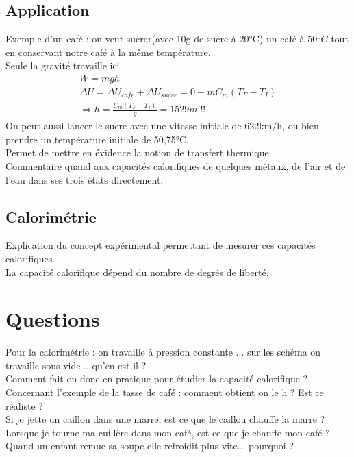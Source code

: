 \documentclass[12pt,prb,aps,epsf]{report}
\begin{document}
\subsection{Application}
Exemple d'un café : on veut sucrer(avec 10g de sucre à 20°C) un café à $50°C$ tout en conservant notre café à la même température.\\
Seule la gravité travaille ici
\begin{eqnarray}
W = mgh\\
\Delta U = \Delta U_{cafe} + \Delta U_{sucre} = 0 + mC_m(T_F-T_I)\\
\Rightarrow h= \frac{C_m(T_F-T_I)}{g} = 1529m!!!
\end{eqnarray}
On peut aussi lancer le sucre avec une vitesse initiale de 622km/h, ou bien prendre un température initiale de 50,75°C.\\
Permet de mettre en évidence la notion de transfert thermique.\\
Commentaire quand aux capacités calorifiques de quelques métaux, de l'air et de l'eau dans ses trois états directement.
\subsection{Calorimétrie}
Explication du concept expérimental permettant de mesurer ces capacités calorifiques.\\
La capacité calorifique dépend du nombre de degrés de liberté.

\section*{Questions}
Pour la calorimétrie : on travaille à pression constante ... sur les schéma on travaille sous vide .. qu'en est il ?\\
Comment fait on donc en pratique pour étudier la capacité calorifique ?\\

Concernant l'exemple de la tasse de café : comment obtient on le h ? Est ce réaliste ?\\

Si je jette un caillou dans une marre, est ce que le caillou chauffe la marre ?\\

Lorsque je tourne ma cuillère dans mon café, est ce que je chauffe mon café ?\\

Quand un enfant remue sa soupe elle refroidit plus vite... pourquoi ?\\
\end{document}
